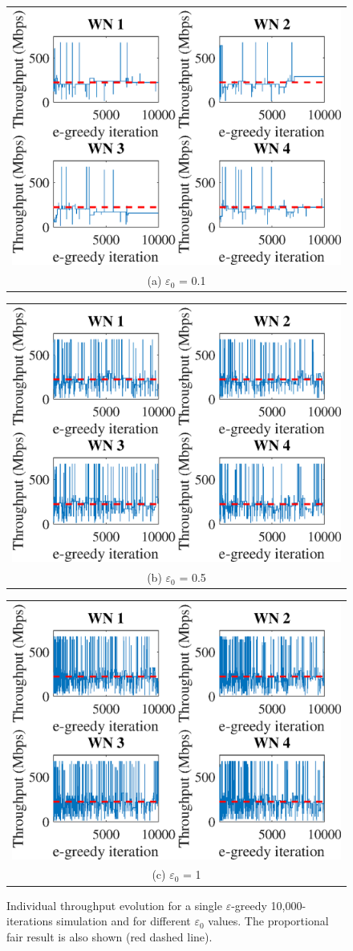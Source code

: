 \documentclass[10pt,journal,compsoc]{IEEEtran}
\begin{document}
	\begin{figure}
		\centering
		\begin{tabular}{@{}c@{}}
			\includegraphics[width=.25\textwidth]{images/NEW_temporal_individual_tpt_e-greedy_e01} \\[\abovecaptionskip]
			\small (a) $\varepsilon_0$ = 0.1
			\label{fig:eg_e01_ind_tpt}
		\end{tabular}	
		\hspace{\floatsep}	
		\begin{tabular}{@{}c@{}}
			\includegraphics[width=.25\textwidth]{images/NEW_temporal_individual_tpt_e-greedy_e05} \\[\abovecaptionskip]
			\small (b) $\varepsilon_0$ = 0.5
			\label{fig:eg_e05_ind_tpt}
		\end{tabular}
		\hspace{\floatsep}
		\begin{tabular}{@{}c@{}}
			\includegraphics[width=.25\textwidth]{images/NEW_temporal_individual_tpt_e-greedy_e1} \\[\abovecaptionskip]
			\small (c) $\varepsilon_0$ = 1
			\label{fig:eg_e1_ind_tpt}
		\end{tabular}
		\caption{Individual throughput evolution for a single $\varepsilon$-greedy 10,000-iterations simulation and for different $\varepsilon_0$ values. The proportional fair result is also shown (red dashed line).}
		\label{fig:eg_ind_tpt}
	\end{figure}
	
\end{document}
